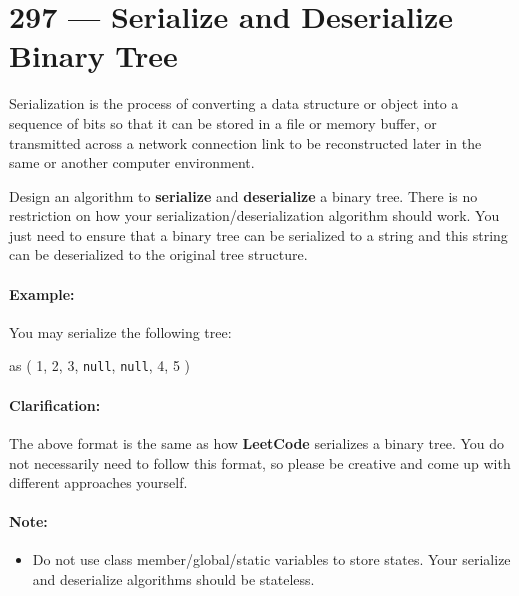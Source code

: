 \section{297 --- Serialize and Deserialize Binary Tree}
Serialization is the process of converting a data structure or object into a sequence of bits so that it can be stored in a file or memory buffer, or transmitted across a network connection link to be reconstructed later in the same or another computer environment.
\par
Design an algorithm to \textbf{serialize} and \textbf{deserialize} a binary tree. There is no restriction on how your serialization/deserialization algorithm should work. You just need to ensure that a binary tree can be serialized to a string and this string can be deserialized to the original tree structure.

\paragraph{Example: }

\begin{flushleft}
You may serialize the following tree:
\begin{figure}[H]
\end{figure}
as ( 1, 2, 3, \texttt{null}, \texttt{null}, 4, 5 )
\end{flushleft}
\par
\paragraph{Clarification:}
\begin{flushleft}
The above format is the same as how \textbf{LeetCode} serializes a binary tree. You do not necessarily need to follow this format, so please be creative and come up with different approaches yourself.
\end{flushleft}
\par
\paragraph{Note:}
\begin{itemize}
\item  Do not use class member/global/static variables to store states. Your serialize and deserialize algorithms should be stateless.
\end{itemize}
